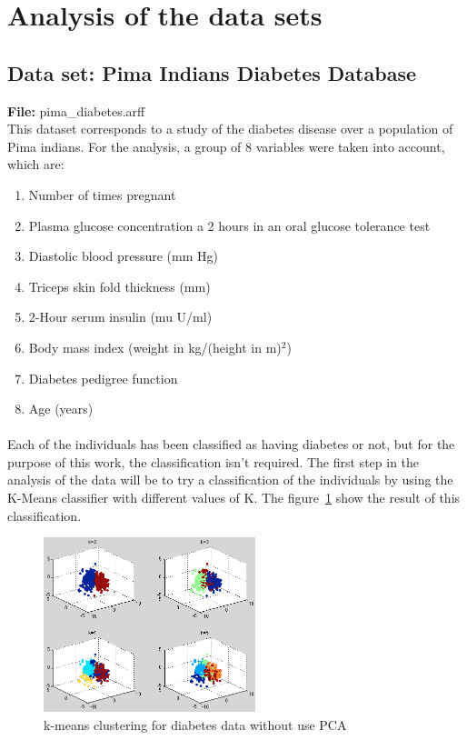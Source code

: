 \documentclass[12pt, a4paper]{article}
\begin{document}
\section{Analysis of the data sets} %
\label{sec:analysis_of_the_data_sets}

\subsection{Data set: Pima Indians Diabetes Database} %
\label{sub:data_set_pima_indians_diabetes_database}
\textbf{File:} pima\_diabetes.arff\\

This dataset corresponds to a study of the diabetes disease over a population of Pima indians. For the analysis, a group of 8  variables were taken into account, which are:

\begin{enumerate}
	\item Number of times pregnant
	\item Plasma glucose concentration a 2 hours in an oral glucose tolerance test
	\item Diastolic blood pressure (mm Hg)
	\item Triceps skin fold thickness (mm)
	\item 2-Hour serum insulin (mu U/ml)
	\item Body mass index (weight in kg/(height in m)$^2$)
	\item Diabetes pedigree function
	\item Age (years)
\end{enumerate}

\paragraph{}Each of the individuals has been classified as having diabetes or not, but for the purpose of this work, the classification isn't required. The first step in the analysis of the data will be to try a classification of the individuals by using the K-Means classifier with different values of K. The figure~\ref{fig:diabetes_1} show the result of this classification.
\begin{figure}[ht!]
	\centering
	\includegraphics[width=0.55\textwidth]{img/Diabetes_1}
	\caption{k-means clustering for diabetes data without use PCA}
	\label{fig:diabetes_1}
\end{figure}
\end{document}
